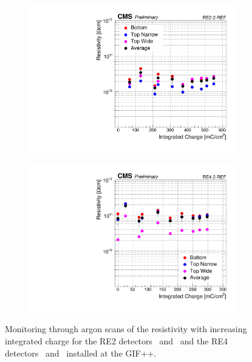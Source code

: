\begin{figure}[H]
\begin{subfigure}{0.5\linewidth}
    		\includegraphics[width = \linewidth]{fig/chapt5/Resistivity_vs_time_RE2-2-REF.pdf}
        	\caption{\label{fig:Resistivity-time:C}}
    	\end{subfigure}
    	\begin{subfigure}{0.5\linewidth}
			\centering
    		\includegraphics[width = \linewidth]{fig/chapt5/Resistivity_vs_time_RE4-2-REF.pdf}
        	\caption{\label{fig:Resistivity-time:D}}
    	\end{subfigure}
		\caption{\label{fig:Resistivity-time} Monitoring through argon scans of the resistivity with increasing integrated charge for the RE2 detectors~ and~ and the RE4 detectors~ and~ installed at the GIF++.}
	\end{figure}
	
